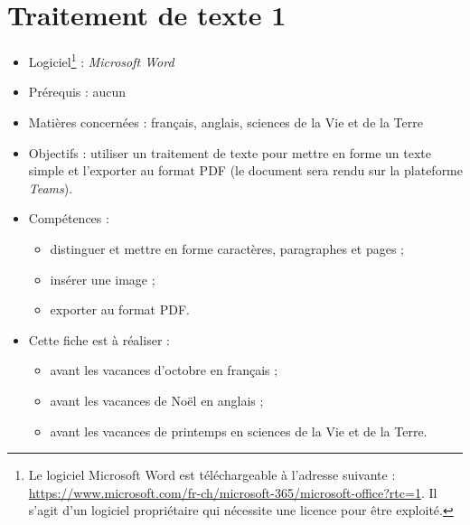 \chapter{Traitement de texte 1}\label{ficheTexte1}  

\begin{itemize}
\item Logiciel\footnote{Le logiciel Microsoft Word est téléchargeable à l'adresse suivante : \url{https://www.microsoft.com/fr-ch/microsoft-365/microsoft-office?rtc=1}. Il s'agit d'un logiciel propriétaire qui nécessite une licence pour être exploité.} : \emph{Microsoft Word} 
\item Prérequis : aucun
\item Matières concernées : français, anglais, sciences de la Vie et de la Terre
\item Objectifs : utiliser un traitement de texte pour mettre en forme un texte simple et l'exporter au format PDF (le document sera rendu sur la plateforme \emph{Teams}).
\item Compétences : 
        \begin{itemize}
        \item distinguer et mettre en forme caractères, paragraphes et pages ;
        \item insérer une image ; 
        \item exporter au format PDF.
        \end{itemize}
\item Cette fiche est à réaliser :
        \begin{itemize}
        \item avant les vacances d'octobre en français ;
        \item avant les vacances de Noël en anglais ;
        \item avant les vacances de printemps en sciences de la Vie et de la Terre. 
        \end{itemize}
\end{itemize}


